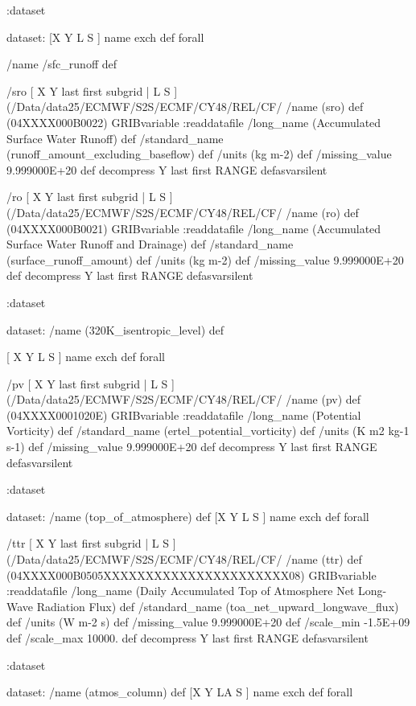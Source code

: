 \begin{ingrid}
:dataset

dataset:
[X Y L S ] {name exch def } forall

/name /sfc_runoff def

/sro { [ X Y last first subgrid | L S ] (/Data/data25/ECMWF/S2S/ECMF/CY48/REL/CF/%
/name (sro) def
(04XXXX000B0022) GRIBvariable
:readdatafile
/long_name (Accumulated Surface Water Runoff) def
/standard_name (runoff_amount_excluding_baseflow) def
/units (kg m-2) def
/missing_value 9.999000E+20 def
decompress
Y last first RANGE
} defasvarsilent

/ro { [ X Y last first subgrid | L S ] (/Data/data25/ECMWF/S2S/ECMF/CY48/REL/CF/%
/name (ro) def
(04XXXX000B0021) GRIBvariable
:readdatafile
/long_name (Accumulated Surface Water Runoff and Drainage) def
/standard_name (surface_runoff_amount) def
/units (kg m-2) def
/missing_value 9.999000E+20 def
decompress
Y last first RANGE
} defasvarsilent

:dataset


dataset:
/name (320K_isentropic_level) def

[ X Y L S ] { name exch def } forall

/pv { [ X Y last first subgrid | L S ] (/Data/data25/ECMWF/S2S/ECMF/CY48/REL/CF/%
/name (pv) def
(04XXXX0001020E) GRIBvariable
:readdatafile
/long_name (Potential Vorticity) def
/standard_name (ertel_potential_vorticity) def
/units (K m2 kg-1 s-1) def
/missing_value 9.999000E+20 def
decompress
Y last first RANGE
} defasvarsilent

:dataset


dataset:
/name (top_of_atmosphere) def
[X Y L S ] {name exch def } forall

/ttr { [ X Y last first subgrid | L S ] (/Data/data25/ECMWF/S2S/ECMF/CY48/REL/CF/%
/name (ttr) def
(04XXXX000B0505XXXXXXXXXXXXXXXXXXXXXX08) GRIBvariable
:readdatafile
/long_name (Daily Accumulated Top of Atmosphere Net Long-Wave Radiation Flux) def
/standard_name (toa_net_upward_longwave_flux) def
/units (W m-2 s) def
/missing_value 9.999000E+20 def
/scale_min -1.5E+09 def
/scale_max 10000. def
decompress
Y last first RANGE
} defasvarsilent

:dataset

dataset:
/name (atmos_column) def
[X Y LA S ] {name exch def } forall


\end{ingrid}
